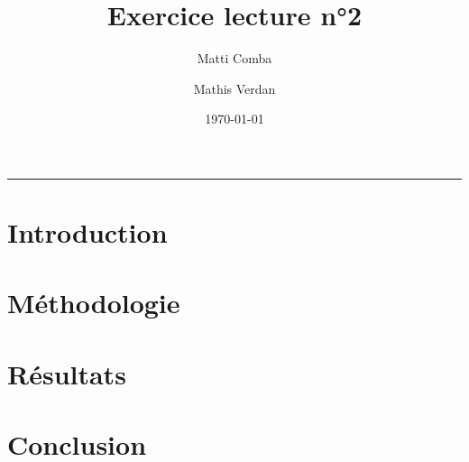 \documentclass{article}
\title{Exercice lecture n°2}
\author{Matti Comba \and Mathis Verdan}
\date{\today}
\begin{document}
\maketitle
\begin{center}
  \rule{\linewidth}{0.5mm}
\end{center}


\section{Introduction}
\lipsum[1] %

\section{Méthodologie}
\lipsum[2-3] %

\section{Résultats}
\lipsum[4-5] %

\section{Conclusion}
\lipsum[6] %
\end{document}
